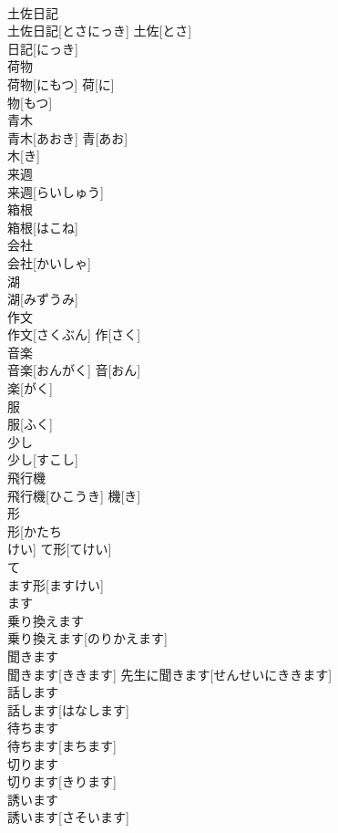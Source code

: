 \documentclass[8pt]{extreport}
\begin{document}
\begin{CJK}{UTF8}{min}
\\	土佐日記	
\\	土佐日記[とさにっき]	土佐[とさ] 
\\	日記[にっき] 
\\	荷物	
\\	荷物[にもつ]	荷[に] 
\\	物[もつ] 
\\	青木	
\\	青木[あおき]	青[あお] 
\\	木[き] 
\\	来週	
\\	来週[らいしゅう]	
\\	箱根	
\\	箱根[はこね]	
\\	会社	
\\	会社[かいしゃ]	
\\	湖	
\\	湖[みずうみ]	
\\	作文	
\\	作文[さくぶん]	作[さく] 
\\	音楽	
\\	音楽[おんがく]	音[おん] 
\\	楽[がく] 
\\	服	
\\	服[ふく]	
\\	少し	
\\	少し[すこし]	
\\	飛行機	
\\	飛行機[ひこうき]	機[き] 
\\	形	
\\	形[かたち 
\\	けい]	て形[てけい] 
\\	て 
\\	ます形[ますけい] 
\\	ます 
\\	乗り換えます	
\\	乗り換えます[のりかえます]	
\\	聞きます	
\\	聞きます[ききます]	先生に聞きます[せんせいにききます] 
\\	話します	
\\	話します[はなします]	
\\	待ちます	
\\	待ちます[まちます]	
\\	切ります	
\\	切ります[きります]	
\\	誘います	
\\	誘います[さそいます]	

\end{CJK}
\end{document}
